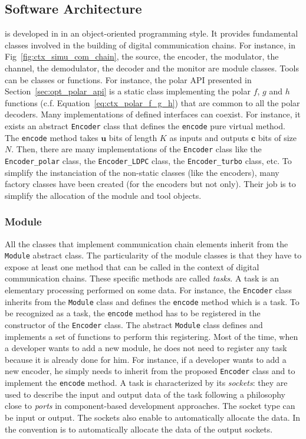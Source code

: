 \subsection{Software Architecture}
\label{sec:aff3ct_archi}

\AFFECT is developed in \Cxx in an object-oriented programming style. It
provides fundamental classes involved in the building of digital communication
chains. For instance, in Fig~\ref{fig:ctx_simu_com_chain}, the source, the
encoder, the modulator, the channel, the demodulator, the decoder and the
monitor are module classes. Tools can be classes or functions. For instance, the
polar API presented in Section~\ref{sec:opt_polar_api} is a static class
implementing the polar $f$, $g$ and $h$ functions (c.f.
Equation~\ref{eq:ctx_polar_f_g_h}) that are common to all the polar decoders.
Many implementations of defined interfaces can coexist. For instance, it exists
an abstract \verb|Encoder| class that defines the \verb|encode| pure virtual
method. The \verb|encode| method takes $\bm{u}$ bits of length $K$ as inputs and
outputs $\bm{c}$ bits of size $N$. Then, there are many implementations of the
\verb|Encoder| class like the \verb|Encoder_polar| class, the
\verb|Encoder_LDPC| class, the \verb|Encoder_turbo| class, etc. To simplify the
instanciation of the non-static classes (like the encoders), many factory
classes have been created (for the encoders but not only). Their job is to
simplify the allocation of the module and tool objects.

\subsubsection{Module}

All the classes that implement communication chain elements inherit from the
\verb|Module| abstract class. The particularity of the module classes is that
they have to expose at least one method that can be called in the context of
digital communication chains. These specific methods are called \emph{tasks}.
A task is an elementary processing performed on some data. For instance, the
\verb|Encoder| class inherits from the \verb|Module| class and defines the
\verb|encode| method which is a task. To be recognized as a task, the
\verb|encode| method has to be registered in the constructor of the
\verb|Encoder| class. The abstract \verb|Module| class defines and implements a
set of functions to perform this registering. Most of the time, when a developer
wants to add a new module, he does not need to register any task because it is
already done for him. For instance, if a developer wants to add a new encoder,
he simply needs to inherit from the proposed \verb|Encoder| class and to
implement the \verb|encode| method. A task is characterized by its
\emph{sockets}: they are used to describe the input and output data of the task
following a philosophy close to \emph{ports} in component-based development
approaches. The socket type can be input or output. The sockets also enable to
automatically allocate the data. In \AFFECT the convention is to automatically
allocate the data of the output sockets.

